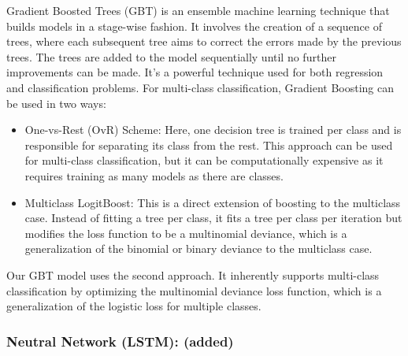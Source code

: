 \documentclass{article}
\begin{document}
Gradient Boosted Trees (GBT) is an ensemble machine learning technique that builds models in a stage-wise fashion. It involves the creation of a sequence of trees, where each subsequent tree aims to correct the errors made by the previous trees. The trees are added to the model sequentially until no further improvements can be made. It's a powerful technique used for both regression and classification problems.
\newline
\newline
For multi-class classification, Gradient Boosting can be used in two ways:
\begin{itemize}
\item One-vs-Rest (OvR) Scheme: Here, one decision tree is trained per class and is responsible for separating its class from the rest. This approach can be used for multi-class classification, but it can be computationally expensive as it requires training as many models as there are classes.

\item Multiclass LogitBoost: This is a direct extension of boosting to the multiclass case. Instead of fitting a tree per class, it fits a tree per class per iteration but modifies the loss function to be a multinomial deviance, which is a generalization of the binomial or binary deviance to the multiclass case.
\newline
\end{itemize}
Our GBT model uses the second approach. It inherently supports multi-class classification by optimizing the multinomial deviance loss function, which is a generalization of the logistic loss for multiple classes.



\subsubsection{Neutral Network (LSTM): (added)}
\end{document}
